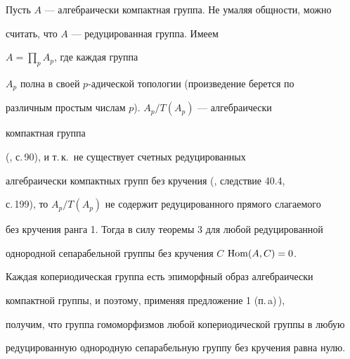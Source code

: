  


\begin{pf} 


Пусть $A$ --- алгебраически компактная группа. Не умаляя общности, можно 


считать, что $A$ --- редуцированная группа. Имеем 


$A=\prod\limits_p A_p$, где каждая группа 


$A_p$ полна в своей $p$-адической топологии (произведение берется по 


различным простым числам $p$).\; $A_p/T(A_p)$ --- алгебраически 


компактная группа 


(\cite{3}, с.\,90), и т.\,к.~не существует счетных редуцированных 


алгебраически компактных групп без кручения (\cite{3}, следствие 40.4, 


с.\,199), то $A_p/T(A_p)$ не содержит редуцированного прямого слагаемого 


без кручения ранга 1. Тогда в силу теоремы 3 для любой редуцированной 


однородной сепарабельной группы без кручения $C$\; $\operatorname{Hom}(A,C)=0$. 


 


Каждая копериодическая группа есть эпиморфный образ алгебраически 


компактной группы, и поэтому, применяя предложение 1 (п.\,a)\,), 


получим, что группа гомоморфизмов любой копериодической группы в любую 


редуцированную однородную сепарабельную группу без кручения равна нулю. 


\end{pf} 


 



